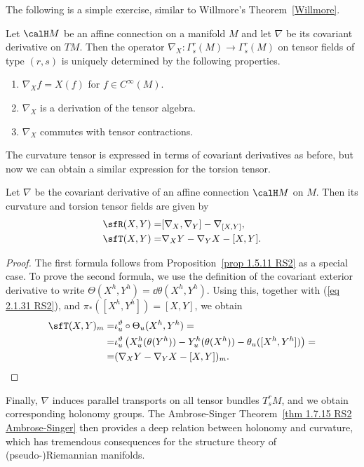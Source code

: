 The following is a simple exercise, similar to Willmore's Theorem~\ref{Willmore}.
\begin{prop}[{{\cite[Prop.~2.1.18]{RS2}}}]\label{prop 2.1.18 RS2}
    Let $\calH M$ be an affine connection on a manifold $M$ and let $\nabla$ be its covariant derivative on $TM$. Then the operator $\nabla_X:\Gamma^r_s(M)\to \Gamma^r_s(M)$ on tensor fields of type $(r,s)$ is uniquely determined by the following properties.
    \begin{enumerate}
        \item $\nabla_X f=X(f)$ for $f\in C^\infty(M)$.
        \item $\nabla_X$ is a derivation of the tensor algebra.
        \item $\nabla_X$ commutes with tensor contractions.
    \end{enumerate}
\end{prop}

The curvature tensor is expressed in terms of covariant derivatives as before, but now we can obtain a similar expression for the torsion tensor.

\begin{prop}[{{\cite[Prop.~2.1.19]{RS2}}}]\label{prop 2.1.19 RS2}
    Let $\nabla$ be the covariant derivative of an affine connection $\calH M$ on $M$. Then its curvature and torsion tensor fields are given by 
    \begin{align}
        \sfR(X,Y)=&[\nabla_X,\nabla_Y]-\nabla_{[X,Y]},\\
        \sfT(X,Y)=&\nabla_X Y-\nabla_Y X-[X,Y].\label{eq 2.1.33 RS2}
    \end{align}
\end{prop}
\begin{proof}
    The first formula follows from Proposition~\ref{prop 1.5.11 RS2} as a special case. To prove the second formula, we use the definition of the covariant exterior derivative to write $\Theta(X^h,Y^h)=\dd\theta(X^h,Y^h)$. Using this, together with (\ref{eq 2.1.31 RS2}), and $\pi_\ast([X^h,Y^h])=[X,Y]$, we obtain 
    \begin{align}
        \sfT(X,Y)_m=&\iota_u^\vartheta\circ \Theta_u(X^h,Y^h)=\\
        =& \iota_u^\vartheta\left(X^h_u(\theta(Y^h))-Y^h_u(\theta(X^h))-\theta_u([X^h,Y^h])\right)=\\
        =&(\nabla_X Y-\nabla_Y X-[X,Y])_m.
    \end{align}
\end{proof}

Finally, $\nabla$ induces parallel transports on all tensor bundles $T^r_s M$, and we obtain corresponding holonomy groups. The Ambrose-Singer Theorem~\ref{thm 1.7.15 RS2 Ambrose-Singer} then provides a deep relation between holonomy and curvature, which has tremendous consequences for the structure theory of (pseudo-)Riemannian manifolds.


